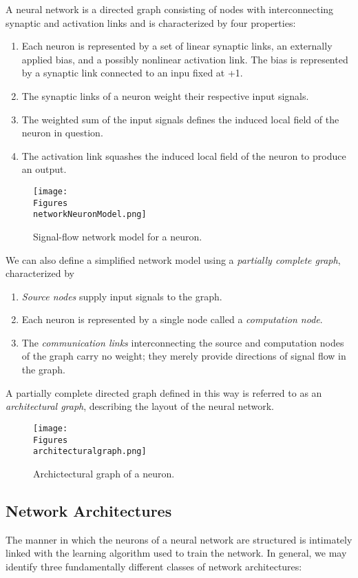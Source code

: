 \documentclass[twocolumn]{article}
\begin{document}
	 A neural network is a directed graph consisting of nodes with interconnecting synaptic and activation links and is characterized by four properties:

	 \begin{enumerate}
		 \item Each neuron is represented by a set of linear synaptic links, an externally applied bias, and a possibly nonlinear activation link. The bias is represented by a synaptic link connected to an inpu fixed at +1.
		 \item The synaptic links of a neuron weight their respective input signals.
		 \item The weighted sum of the input signals defines the induced local field of the neuron in question.
		 \item The activation link squashes the induced local field of the neuron to produce an output.
	 \end{enumerate}

	 \begin{figure}[H]
		 \center
		 \texttt{[image: \\Figures\\networkNeuronModel.png]}
		 \caption{Signal-flow network model for a neuron.}
		 \label{networkNeuronModel}
	 \end{figure}

	 We can also define a simplified network model using a \textit{partially complete graph}, characterized by

	 \begin{enumerate}
		 \item \textit{Source nodes} supply input signals to the graph.
		 \item Each neuron is represented by a single node called a \textit{computation node}.
		 \item The \textit{communication links} interconnecting the source and computation nodes of the graph carry no weight; they merely provide directions of signal flow in the graph.
	 \end{enumerate}

	 A partially complete directed graph defined in this way is referred to as an \textit{architectural graph}, describing the layout of the neural network.

	 \begin{figure}[H]
		 \center
		 \texttt{[image: \\Figures\\architecturalgraph.png]}
		 \caption{Archictectural graph of a neuron.}
		 \label{architecturalgraph}
	 \end{figure}

 \subsection{Network Architectures}
	 The manner in which the neurons of a neural network are structured is intimately linked with the learning algorithm used to train the network. In general, we may identify three fundamentally different classes of network architectures:
\end{document}
